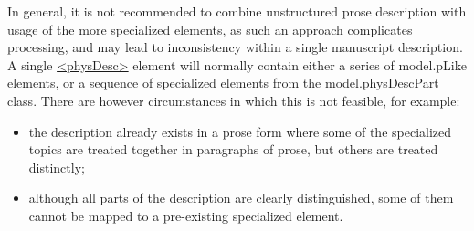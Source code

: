 In general, it is not recommended to combine unstructured prose description with usage of the more specialized elements, as such an approach complicates processing, and may lead to inconsistency within a single manuscript description. A single \hyperref[TEI.physDesc]{<physDesc>} element will normally contain either a series of \textsf{model.pLike} elements, or a sequence of specialized elements from the \textsf{model.physDescPart} class. There are however circumstances in which this is not feasible, for example: \begin{itemize}
\item the description already exists in a prose form where some of the specialized topics are treated together in paragraphs of prose, but others are treated distinctly;
\item although all parts of the description are clearly distinguished, some of them cannot be mapped to a pre-existing specialized element.
\end{itemize} \par
